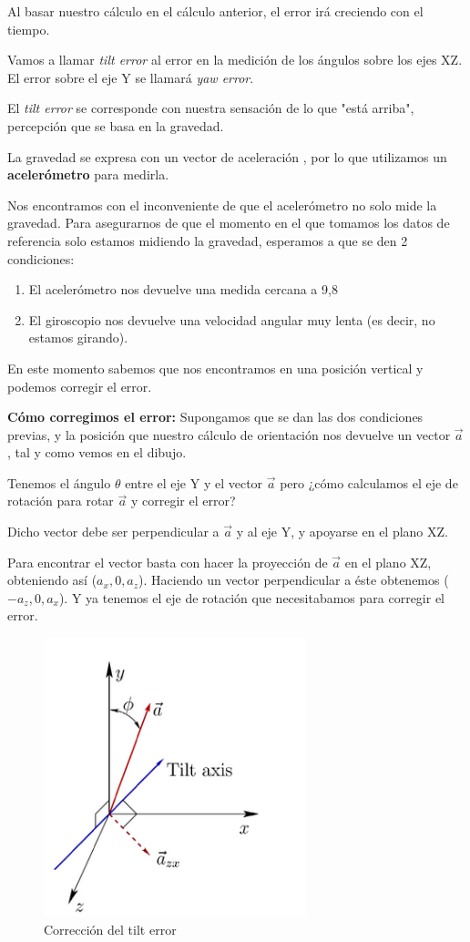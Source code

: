 \documentclass[twoside, 12pt]{epstfg}
\begin{document}
Al basar nuestro cálculo en el cálculo anterior, el error irá creciendo con el tiempo.

Vamos a llamar \textit{tilt error} al error en la medición de los ángulos sobre los ejes XZ. El error sobre el eje Y se llamará \textit{yaw error}.

El \textit{tilt error} se corresponde con nuestra sensación de lo que "está arriba", percepción que se basa en la gravedad.

La gravedad se expresa con un vector de aceleración , por lo que utilizamos un \textbf{acelerómetro} para medirla.

Nos encontramos con el inconveniente de que el acelerómetro no solo mide la gravedad. Para asegurarnos de que el momento en el que tomamos los datos de referencia solo estamos midiendo la gravedad, esperamos a que se den 2 condiciones:
\begin{enumerate}
	\item El acelerómetro nos devuelve una medida cercana a 9,8
	\item El giroscopio nos devuelve una velocidad angular muy lenta (es decir, no estamos girando).
\end{enumerate}

En este momento sabemos que nos encontramos en una posición vertical y podemos corregir el error.

\textbf{Cómo corregimos el error:}
Supongamos que se dan las dos condiciones previas, y la posición que nuestro cálculo de orientación nos devuelve un vector $\vec{a}$, tal y como vemos en el dibujo.

Tenemos el ángulo $\theta$ entre el eje Y y el vector $\vec{a}$ pero ¿cómo calculamos el eje de rotación para rotar $\vec{a}$ y corregir el error?

Dicho vector debe ser perpendicular a $\vec{a}$ y al eje Y, y apoyarse en el plano XZ.

Para encontrar el vector basta con hacer la proyección de $\vec{a}$ en el plano XZ, obteniendo así ($a_x, 0 , a_z$). Haciendo un vector perpendicular a éste obtenemos ($-a_z, 0 , a_x$). Y ya tenemos el eje de rotación que necesitabamos para corregir el error.

\begin{figure}[h]
	\centerline{
		\mbox{\includegraphics[width=3.00in]{images/ejestracking.png}}
	}
	\caption{Corrección del tilt error}
\end{figure}
\end{document}
